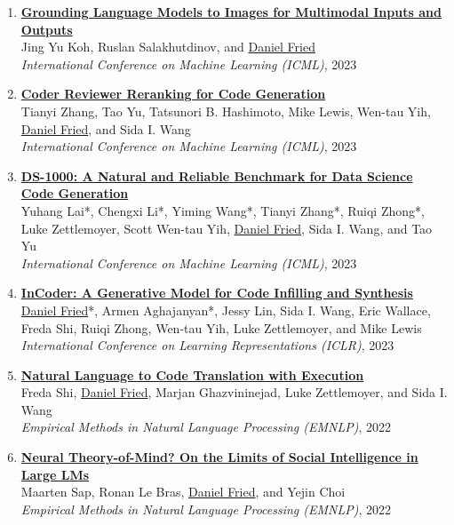 \begin{enumerate}[leftmargin=-1mm,partopsep=0pt]
\item \href{https://arxiv.org/abs/2301.13823}{\textbf{Grounding Language Models to Images for Multimodal Inputs and Outputs}} \\
  Jing Yu Koh, Ruslan Salakhutdinov, and \underline{Daniel Fried}\\
  \emph{International Conference on Machine Learning (ICML)}, 2023

\item \href{https://arxiv.org/abs/2211.16490}{\textbf{Coder Reviewer Reranking for Code Generation}} \\
  Tianyi Zhang, Tao Yu, Tatsunori B. Hashimoto, Mike Lewis, Wen-tau Yih, \underline{Daniel Fried}, and Sida I. Wang\\
  \emph{International Conference on Machine Learning (ICML)}, 2023

\item \href{https://arxiv.org/abs/2211.11501}{\textbf{DS-1000: A Natural and Reliable Benchmark for Data Science Code Generation}} \\
  Yuhang Lai*, Chengxi Li*, Yiming Wang*, Tianyi Zhang*, Ruiqi Zhong*, Luke Zettlemoyer, Scott Wen-tau Yih, \underline{Daniel Fried}, Sida I. Wang, and Tao Yu\\
  \emph{International Conference on Machine Learning (ICML)}, 2023

\item \href{https://arxiv.org/abs/2204.05999}{\textbf{InCoder: A Generative Model for Code Infilling and Synthesis}} \\
  \underline{Daniel Fried}*, Armen Aghajanyan*, Jessy Lin, Sida I. Wang, Eric Wallace, Freda Shi, Ruiqi Zhong, Wen-tau Yih, Luke Zettlemoyer, and Mike Lewis\\
  \emph{International Conference on Learning Representations (ICLR)}, 2023

\item \href{https://arxiv.org/abs/2204.11454}{\textbf{Natural Language to Code Translation with Execution}} \\
  Freda Shi, \underline{Daniel Fried}, Marjan Ghazvininejad, Luke Zettlemoyer, and Sida I. Wang\\
  \emph{Empirical Methods in Natural Language Processing (EMNLP)}, 2022

\item \href{https://arxiv.org/abs/2210.13312}{\textbf{Neural Theory-of-Mind? On the Limits of Social Intelligence in Large LMs}} \\
  Maarten Sap, Ronan Le Bras, \underline{Daniel Fried}, and Yejin Choi \\
  \emph{Empirical Methods in Natural Language Processing (EMNLP)}, 2022


\end{enumerate}
